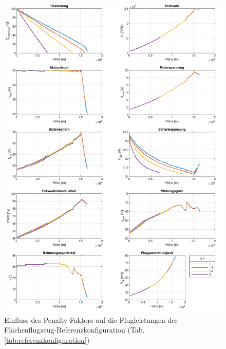 \begin{figure}[H]
\centering
	\includegraphics[scale=0.7]{Diagramme/Flaechenflzg_fp.pdf}
	\caption{Einfluss des Penalty-Faktors auf die Flugleistungen der Flächenflugzeug-Referenzkonfiguration (Tab. \ref{tab:referenzkonfiguration})}
	\label{abb:fp}
\end{figure}

